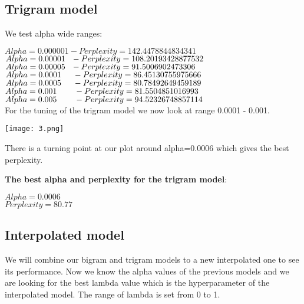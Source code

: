 \documentclass[12pt]{article}
\begin{document}
\vspace{5cm}


\subsection{Trigram model}

We test alpha wide ranges:

$Alpha=0.000001  - Perplexity= 142.4478844834341$ \\
$Alpha=0.00001 \hspace{0.25cm} - Perplexity= 108.20193428877532$ \\
$Alpha=0.00005 \hspace{0.25cm} - Perplexity= 91.5006902473306$ \\
$Alpha=0.0001 \hspace{0.5cm}  - Perplexity= 86.45130755975666$ \\
$Alpha=0.0005 \hspace{0.5cm}  - Perplexity= 80.78492649459189$ \\
$Alpha=0.001 \hspace{0.75cm}  - Perplexity= 81.5504851016993$ \\ 
$Alpha=0.005 \hspace{0.75cm}  - Perplexity= 94.52326748857114$ \\

For the tuning of the trigram model we now look at range 0.0001 - 0.001.

\vspace{1cm}

\texttt{[image: 3.png]}

\vspace{1cm}

There is a turning point at our plot around alpha=0.0006 which gives the best perplexity.

\vspace{0.5cm}



\textbf{The best alpha and perplexity for the trigram model}:

$Alpha = 0.0006$ \\
$Perplexity = 80.77$


\subsection{Interpolated model}

We will combine our bigram and trigram models to a new interpolated one to see its performance. Now we
know the alpha values of the previous models and we are looking for the best lambda value which is the
hyperparameter of the interpolated model. The range of lambda is set from 0 to 1.
\end{document}
